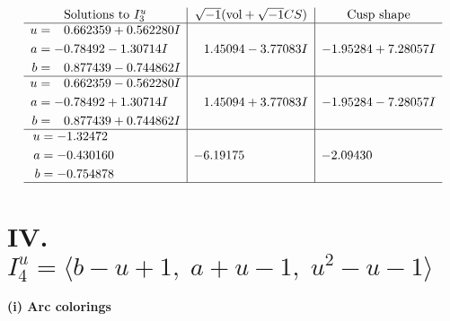 \documentclass[1p]{elsarticle_modified}
\theoremstyle{definition}
\newcommand{\I}{\sqrt{-1}}
\begin{document}
$$\begin{array}{c|c|c}  
\text{Solutions to }I^u_{3}& \I (\text{vol} + \sqrt{-1}CS) & \text{Cusp shape}\\
 \hline 
\begin{aligned}
u &= \phantom{-}0.662359 + 0.562280 I \\
a &= -0.78492 - 1.30714 I \\
b &= \phantom{-}0.877439 - 0.744862 I\end{aligned}
 & \phantom{-}1.45094 - 3.77083 I & -1.95284 + 7.28057 I \\ \hline\begin{aligned}
u &= \phantom{-}0.662359 - 0.562280 I \\
a &= -0.78492 + 1.30714 I \\
b &= \phantom{-}0.877439 + 0.744862 I\end{aligned}
 & \phantom{-}1.45094 + 3.77083 I & -1.95284 - 7.28057 I \\ \hline\begin{aligned}
u &= -1.32472\phantom{ +0.000000I} \\
a &= -0.430160\phantom{ +0.000000I} \\
b &= -0.754878\phantom{ +0.000000I}\end{aligned}
 & -6.19175\phantom{ +0.000000I} & -2.09430\phantom{ +0.000000I}\\
 \hline 
 \end{array}$$\newpage\newpage\renewcommand{\arraystretch}{1}
\centering \section*{IV. $I^u_{4}= \langle b- u+1,\;a+u-1,\;u^2- u-1 \rangle$}
\flushleft \textbf{(i) Arc colorings}\\
\end{document}
